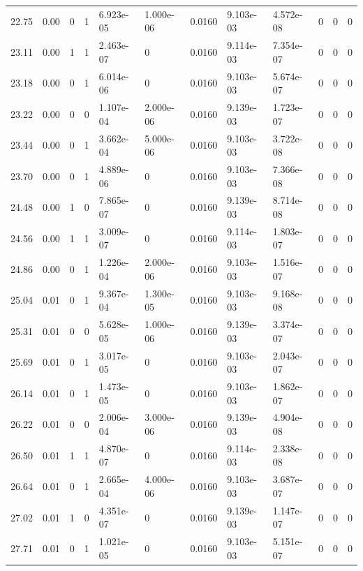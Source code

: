 \documentclass[preview]{standalone}
\begin{document}
{{{\begin{tabular}{L{1.2cm}C{1.2cm} C{0.3cm}C{0.5cm} C{1.4cm}C{1.4cm} C{1.4cm}C{1.4cm} C{1.6cm}C{1.6cm} C{1.6cm}C{1.6cm}}
  22.75  &  0.00  & 0     &  1 &  6.923e-05  & 1.000e-06  &  0.0160&   9.103e-03& 4.572e-08 & 0   &  0 & 0  \\ 
  23.11  &  0.00  & 1     &  1 &  2.463e-07  & 0  &  0.0160&   9.114e-03& 7.354e-07 & 0   &  0 & 0  \\ 
  23.18  &  0.00  & 0     &  1 &  6.014e-06  & 0  &  0.0160&   9.103e-03& 5.674e-07 & 0   &  0 & 0  \\ 
  23.22  &  0.00  & 0     &  0 &  1.107e-04  & 2.000e-06  &  0.0160&   9.139e-03& 1.723e-07 & 0   &  0 & 0  \\ 
  23.44  &  0.00  & 0     &  1 &  3.662e-04  & 5.000e-06  &  0.0160&   9.103e-03& 3.722e-08 & 0   &  0 & 0  \\ 
  23.70  &  0.00  & 0     &  1 &  4.889e-06  & 0  &  0.0160&   9.103e-03& 7.366e-08 & 0   &  0 & 0  \\ 
  24.48  &  0.00  & 1     &  0 &  7.865e-07  & 0  &  0.0160&   9.139e-03& 8.714e-08 & 0   &  0 & 0  \\ 
  24.56  &  0.00  & 1     &  1 &  3.009e-07  & 0  &  0.0160&   9.114e-03& 1.803e-07 & 0   &  0 & 0  \\ 
  24.86  &  0.00  & 0     &  1 &  1.226e-04  & 2.000e-06  &  0.0160&   9.103e-03& 1.516e-07 & 0   &  0 & 0  \\ 
  25.04  &  0.01  & 0     &  1 &  9.367e-04  & 1.300e-05  &  0.0160&   9.103e-03& 9.168e-08 & 0   &  0 & 0  \\ 
  25.31  &  0.01  & 0     &  0 &  5.628e-05  & 1.000e-06  &  0.0160&   9.139e-03& 3.374e-07 & 0   &  0 & 0  \\ 
  25.69  &  0.01  & 0     &  1 &  3.017e-05  & 0  &  0.0160&   9.103e-03& 2.043e-07 & 0   &  0 & 0  \\ 
  26.14  &  0.01  & 0     &  1 &  1.473e-05  & 0  &  0.0160&   9.103e-03& 1.862e-07 & 0   &  0 & 0  \\ 
  26.22  &  0.01  & 0     &  0 &  2.006e-04  & 3.000e-06  &  0.0160&   9.139e-03& 4.904e-08 & 0   &  0 & 0  \\ 
  26.50  &  0.01  & 1     &  1 &  4.870e-07  & 0  &  0.0160&   9.114e-03& 2.338e-08 & 0   &  0 & 0  \\ 
  26.64  &  0.01  & 0     &  1 &  2.665e-04  & 4.000e-06  &  0.0160&   9.103e-03& 3.687e-07 & 0   &  0 & 0  \\ 
  27.02  &  0.01  & 1     &  0 &  4.351e-07  & 0  &  0.0160&   9.139e-03& 1.147e-07 & 0   &  0 & 0  \\ 
  27.71  &  0.01  & 0     &  1 &  1.021e-05  & 0  &  0.0160&   9.103e-03& 5.151e-07 & 0   &  0 & 0  \\ 

\end{tabular}}}}
\end{document}
